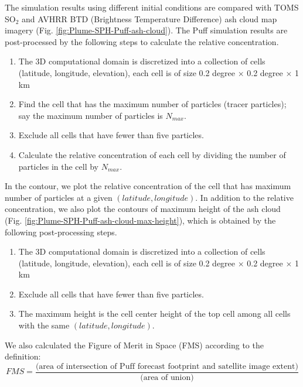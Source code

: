 \documentclass[utf8]{frontiersSCNS} %
\begin{document}
The simulation results using different initial conditions are compared with TOMS SO$_2$ and AVHRR BTD (Brightness Temperature Difference) ash cloud map imagery (Fig. \ref{fig:Plume-SPH-Puff-ash-cloud}). The Puff simulation results are post-processed by the following steps to calculate the relative concentration.
\begin{enumerate}
\item The 3D computational domain is discretized into a collection of cells (latitude, longitude, elevation), each cell is of size 0.2 degree  $\times$ 0.2 degree  $\times$ 1 km
\item  Find the cell that has the maximum number of particles (tracer particles); say the maximum number of particles is $N_{max}$.
\item Exclude all cells that have fewer than five particles.
\item Calculate the relative concentration of each cell by dividing the number of particles in the cell by $N_{max}$.
\end{enumerate}
In the contour, we plot the relative concentration of the cell that has maximum number of particles at a given $(latitude, longitude)$.
In addition to the relative concentration, we also plot the contours of maximum height of the ash cloud (Fig. \ref{fig:Plume-SPH-Puff-ash-cloud-max-height}), which is obtained by the following post-processing steps.
\begin{enumerate}
\item The 3D computational domain is discretized into a collection of cells (latitude, longitude, elevation), each cell is of size 0.2 degree $\times$ 0.2 degree  $\times$ 1 km
\item Exclude all cells that have fewer than five particles.
\item The maximum height is the cell center height of the top cell among all cells with the same $(latitude, longitude)$.
\end{enumerate}
We also calculated the Figure of Merit in Space (FMS) according to the definition: 
\[
FMS = \frac{\mbox{(area of intersection of Puff forecast footprint and satellite image extent)}}{\mbox{(area of union)}}
\]
\end{document}
